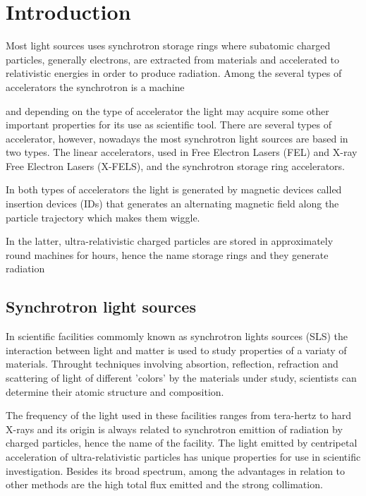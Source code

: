 \documentclass[
	12pt,				%
	openright,			%
	oneside,			%
	a4paper,		%
	chapter=TITLE,		%
	section=TITLE,		%
    brazil,				%
	english,			%
	sumario=tradicional,
	]{abntex2}
\begin{document}
	\frenchspacing

	\pretextual
	

	\textual

%	

\chapter{Introduction} \label{chap:intro}




Most light sources uses synchrotron storage rings where subatomic charged particles, generally electrons, are extracted from materials and accelerated to relativistic energies in order to produce radiation. Among the several types of accelerators the synchrotron is a machine


and depending on the type of accelerator the light may acquire some other important properties for its use as scientific tool. There are several types of accelerator, however, nowadays the most  synchrotron light sources are based in two types. The linear accelerators, used in Free Electron Lasers (FEL) and X-ray Free Electron Lasers (X-FELS), and the synchrotron storage ring accelerators.

In both types of accelerators the light is generated by magnetic devices called insertion devices (IDs) that generates an alternating magnetic field along the particle trajectory which makes them wiggle.


In the latter, ultra-relativistic charged particles are stored in approximately round machines for hours, hence the name storage rings and they generate radiation

  \section{Synchrotron light sources}

  In scientific facilities commomly known as synchrotron lights sources (SLS) the interaction between light and matter is used to study properties of a variaty of materials. Throught techniques involving absortion, reflection, refraction and scattering of light of different 'colors' by the materials under study, scientists can determine their atomic structure and composition.

  The frequency of the light used in these facilities ranges from tera-hertz to hard X-rays and its origin is always related to synchrotron emittion of radiation by charged particles, hence the name of the facility. The light emitted by centripetal acceleration of ultra-relativistic particles has unique properties for use in scientific investigation. Besides its broad spectrum, among the advantages in relation to other methods are the high total flux emitted and the strong collimation.
\end{document}
